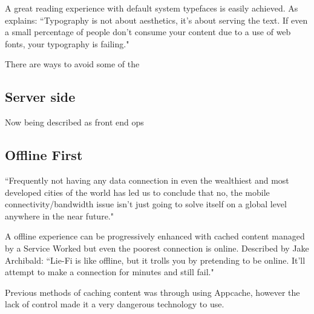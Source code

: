 A great reading experience with default system typefaces is easily achieved. As \cite{against_webfonts} explains: ``Typography is not about aesthetics, it's about serving the text. If even a small percentage of people don't consume your content due to a use of web fonts, your typography is failing."

There are ways to avoid some of the %

\subsection{Server side}

Now being described as front end ops






\subsection{Offline First}

``Frequently not having any data connection in even the wealthiest and most developed cities of the world has led us to conclude that no, the mobile connectivity/bandwidth issue isn’t just going to solve itself on a global level anywhere in the near future." \cite{hello_to_offline_first}


A offline experience can be progressively enhanced with cached content managed by a Service Worked but even the poorest connection is online.
Described by Jake Archibald: ``Lie-Fi is like offline, but it trolls you by pretending to be online. It'll attempt to make a connection for minutes and still fail." \cite{supercharging_page_load}

Previous methods of caching content was through using Appcache, however the lack of control made it a very dangerous technology to use. %

